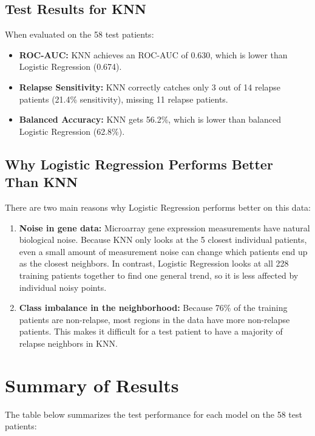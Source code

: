 \documentclass[11pt,a4paper]{article}
\begin{document}
\subsection{Test Results for KNN}
When evaluated on the 58 test patients:
\begin{itemize}
    \item \textbf{ROC-AUC:} KNN achieves an ROC-AUC of 0.630, which is lower than Logistic Regression (0.674).
    \item \textbf{Relapse Sensitivity:} KNN correctly catches only 3 out of 14 relapse patients (21.4\% sensitivity), missing 11 relapse patients.
    \item \textbf{Balanced Accuracy:} KNN gets 56.2\%, which is lower than balanced Logistic Regression (62.8\%).
\end{itemize}

\subsection{Why Logistic Regression Performs Better Than KNN}
There are two main reasons why Logistic Regression performs better on this data:
\begin{enumerate}
    \item \textbf{Noise in gene data:} Microarray gene expression measurements have natural biological noise. Because KNN only looks at the 5 closest individual patients, even a small amount of measurement noise can change which patients end up as the closest neighbors. In contrast, Logistic Regression looks at all 228 training patients together to find one general trend, so it is less affected by individual noisy points.
    \item \textbf{Class imbalance in the neighborhood:} Because 76\% of the training patients are non-relapse, most regions in the data have more non-relapse patients. This makes it difficult for a test patient to have a majority of relapse neighbors in KNN.
\end{enumerate}

\section{Summary of Results}

The table below summarizes the test performance for each model on the 58 test patients:
\end{document}
